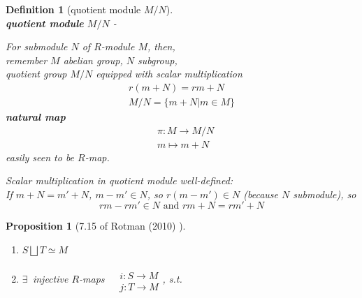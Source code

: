 \documentclass[10pt]{amsart}
\newtheorem{proposition}{Proposition}
\newtheorem{definition}{Definition}
\begin{document}
\begin{multicols*}{2}
\begin{definition}[quotient module $M/N$] \qquad \, \\ 
\textbf{quotient module} $M/N$  -

For submodule $N$ of $R$-module $M$, then, \\
remember $M$ abelian group, $N$ subgroup, \\
quotient group $M/N$ equipped with scalar multiplication 
\[
\begin{gathered}
	r(m+N) = rm+N \\ 
M/N = \lbrace m +N | m \in M \rbrace
\end{gathered}
\]
\textbf{natural map} 
\begin{equation}
\begin{aligned}
& \pi : M \to M /N \\ 
& m\mapsto m + N 
\end{aligned}
\end{equation}
easily seen to be $R$-map.  

Scalar multiplication in quotient module well-defined: \\
If $m+N=m'+N$, $m-m' \in N$, so $r(m-m') \in N$ (because $N$ submodule), so 
\[
rm - rm' \in N \text{ and } rm+ N = rm' +N
\]


\end{definition}


\begin{proposition}[7.15 of Rotman (2010) \cite{JRotman2010}]  
\begin{enumerate}
\item[(i)] $S \bigsqcup T \simeq M$ 
\item[(ii)] $\exists \, $ injective $R$-maps $\begin{aligned} & \quad \\ 
	& i : S\to M \\ 
& j :T \to M \end{aligned}$, s.t. 


\end{enumerate}
\end{proposition}
\end{multicols*}
\end{document}
